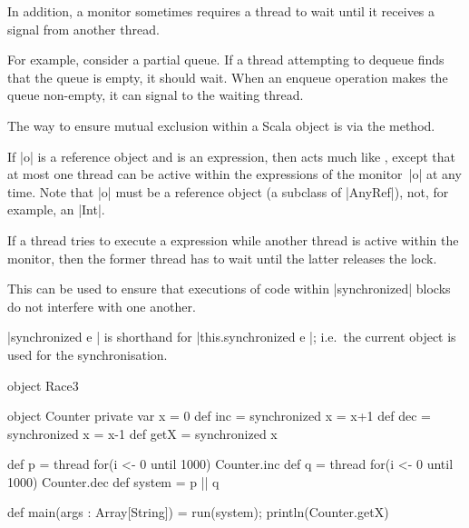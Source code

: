 
\begin{slide}

In addition, a monitor sometimes requires a thread to wait until it receives a
signal from another thread.  

For example, consider a partial queue.  If a thread attempting to dequeue
finds that the queue is empty, it should wait.  When an enqueue operation
makes the queue non-empty, it can signal to the waiting thread.
\end{slide}


\begin{slide}

The way to ensure mutual exclusion within a Scala object  is via the
 method.  

If |o| is a reference object and  is an expression, then
 acts much like , except that at most
one thread can be active within the  expressions of the
monitor~|o| at any time.  Note that |o| must be a reference object (a subclass
of |AnyRef|), not, for example, an |Int|. 

If a thread tries to execute a 
expression while another thread is active within the monitor, then the former
thread has to wait until the latter releases the lock. 

This can be used to ensure that executions of code within
|synchronized| blocks do not interfere with one another. 

|synchronized{ e }| is shorthand for |this.synchronized{ e }|; i.e.~the
current object is used for the synchronisation.
\end{slide}


\begin{slide}

\begin{scala}
object Race3{
  object Counter{
    private var x = 0
    def inc = synchronized{ x = x+1 }
    def dec = synchronized{ x = x-1 }
    def getX = synchronized{ x }
  }

  def p = thread{ for(i <- 0 until 1000) Counter.inc }
  def q = thread{ for(i <- 0 until 1000) Counter.dec }
  def system = p || q

  def main(args : Array[String]) = { run(system); println(Counter.getX) }
}
\end{scala}
\end{slide}

